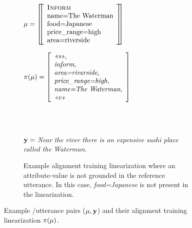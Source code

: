 \begin{figure}[p]
{\begin{minipage}{\textwidth}
\begin{minipage}{0.98\textwidth}
\begin{subfigure}{\textwidth}
\caption{Example alignment training linearization where an attribute-value 
is not grounded in the reference utterance. In this case, \textit{food=Japanese}
is not present in the linearization.}
\center
\begin{minipage}[t]{0.48\textwidth}
\small
$\mu = \left[\!\!\left[\begin{array}{l} 
    \textsc{Inform}\\
    {\textrm{name=The Waterman}}\\
    {\textrm{food=Japanese}}\\
    {\textrm{price\_range=high}}\\
    {\textrm{area=riverside}}\\
\end{array} \right]\!\!\right]$
\end{minipage}
 \hfill
\begin{minipage}[t]{0.48\textwidth}
\small
$\pi(\mu) = \left[ \begin{array}{l}
\textit{<<s>>}, \\
\textit{inform},\\
\textit{area=riverside},\\
\textit{price\_range=high},\\
\textit{name=The Waterman},\\
\textit{<<e>>}\end{array} \right]
$ 
\end{minipage}\\
\begin{minipage}[t]{\textwidth}
~\\[0pt]
$\mathbf{y} = $ \textit{Near the river there is an expensive sushi place
called the Waterman.}
\end{minipage}
\end{subfigure}
\end{minipage}
\end{minipage}}
\caption{Example \meaningrepresentation/utterance pairs ($\mu, \mathbf{y}$) and their alignment
training linearization $\pi(\mu)$.}
\label{fig:atlexamples}
\end{figure}


